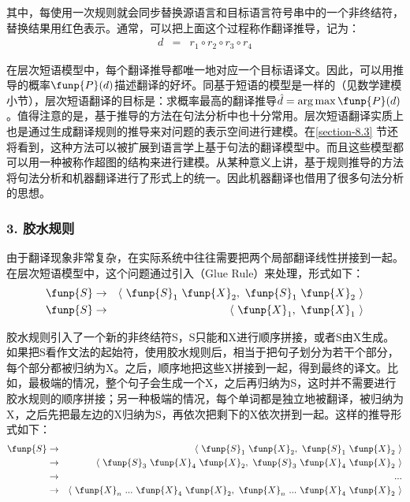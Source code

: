 \noindent 其中，每使用一次规则就会同步替换源语言和目标语言符号串中的一个非终结符，替换结果用红色表示。通常，可以把上面这个过程称作翻译推导，记为：
\begin{eqnarray}
d & = & {r_1} \circ {r_2} \circ {r_3} \circ {r_4}
\label{eq:8-1}
\end{eqnarray}

\parinterval 在层次短语模型中，每个翻译推导都唯一地对应一个目标语译文。因此，可以用推导的概率$\funp{P}(d)$描述翻译的好坏。同基于短语的模型是一样的（见{\chapterseven}数学建模小节），层次短语翻译的目标是：求概率最高的翻译推导$\hat{d}=\arg\max\funp{P}(d)$。值得注意的是，基于推导的方法在句法分析中也十分常用。层次短语翻译实质上也是通过生成翻译规则的推导来对问题的表示空间进行建模。在\ref{section-8.3} 节还将看到，这种方法可以被扩展到语言学上基于句法的翻译模型中。而且这些模型都可以用一种被称作超图的结构来进行建模。从某种意义上讲，基于规则推导的方法将句法分析和机器翻译进行了形式上的统一。因此机器翻译也借用了很多句法分析的思想。


\subsubsection{3. 胶水规则}

\parinterval 由于翻译现象非常复杂，在实际系统中往往需要把两个局部翻译线性拼接到一起。在层次短语模型中，这个问题通过引入{\small{}}（Glue Rule）来处理，形式如下：
\begin{eqnarray}
\funp{S} & \to & \langle\ \funp{S}_1\ \funp{X}_2,\ \funp{S}_1\ \funp{X}_2\ \rangle \nonumber \\
\funp{S} & \to & \langle\ \funp{X}_1,\ \funp{X}_1\ \rangle \nonumber
\end{eqnarray}

\parinterval 胶水规则引入了一个新的非终结符S，S只能和X进行顺序拼接，或者S由X生成。如果把S看作文法的起始符，使用胶水规则后，相当于把句子划分为若干个部分，每个部分都被归纳为X。之后，顺序地把这些X拼接到一起，得到最终的译文。比如，最极端的情况，整个句子会生成一个X，之后再归纳为S，这时并不需要进行胶水规则的顺序拼接；另一种极端的情况，每个单词都是独立地被翻译，被归纳为X，之后先把最左边的X归纳为S，再依次把剩下的X依次拼到一起。这样的推导形式如下：
\begin{eqnarray}
\funp{S} & \to & \langle\ \funp{S}_1\ \funp{X}_2,\ \funp{S}_1\ \funp{X}_2\ \rangle \nonumber \\
                & \to & \langle\ \funp{S}_3\ \funp{X}_4\ \funp{X}_2,\ \funp{S}_3\ \funp{X}_4\ \funp{X}_2\ \rangle \nonumber \\
                & \to & ... \nonumber \\
                & \to & \langle\ \funp{X}_n\ ...\ \funp{X}_4\ \funp{X}_2,\ \funp{X}_n\ ...\ \funp{X}_4\ \funp{X}_2\ \rangle \nonumber
\end{eqnarray}

